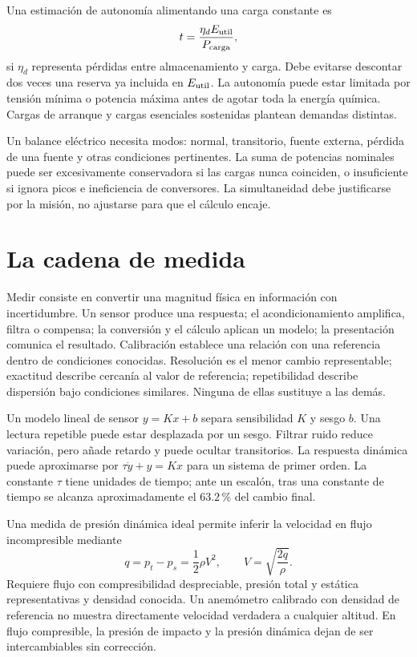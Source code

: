 Una estimación de autonomía alimentando una carga constante es
\begin{equation}
 t=\frac{\eta_d E_{\rm util}}{P_{\rm carga}},
\end{equation}
si $\eta_d$ representa pérdidas entre almacenamiento y carga. Debe evitarse descontar dos veces una reserva ya incluida en $E_{\rm util}$. La autonomía puede estar limitada por tensión mínima o potencia máxima antes de agotar toda la energía química. Cargas de arranque y cargas esenciales sostenidas plantean demandas distintas.

Un balance eléctrico necesita modos: normal, transitorio, fuente externa, pérdida de una fuente y otras condiciones pertinentes. La suma de potencias nominales puede ser excesivamente conservadora si las cargas nunca coinciden, o insuficiente si ignora picos e ineficiencia de conversores. La simultaneidad debe justificarse por la misión, no ajustarse para que el cálculo encaje.

\section{La cadena de medida}
Medir consiste en convertir una magnitud física en información con incertidumbre. Un sensor produce una respuesta; el acondicionamiento amplifica, filtra o compensa; la conversión y el cálculo aplican un modelo; la presentación comunica el resultado. Calibración establece una relación con una referencia dentro de condiciones conocidas. Resolución es el menor cambio representable; exactitud describe cercanía al valor de referencia; repetibilidad describe dispersión bajo condiciones similares. Ninguna de ellas sustituye a las demás.

Un modelo lineal de sensor $y=Kx+b$ separa sensibilidad $K$ y sesgo $b$. Una lectura repetible puede estar desplazada por un sesgo. Filtrar ruido reduce variación, pero añade retardo y puede ocultar transitorios. La respuesta dinámica puede aproximarse por $\tau\dot y+y=Kx$ para un sistema de primer orden. La constante $\tau$ tiene unidades de tiempo; ante un escalón, tras una constante de tiempo se alcanza aproximadamente el $63.2\,\text{\%}$ del cambio final.

Una medida de presión dinámica ideal permite inferir la velocidad en flujo incompresible mediante
\begin{equation}
 q=p_t-p_s=\frac12\rho V^2,\qquad V=\sqrt{\frac{2q}{\rho}}.
\end{equation}
Requiere flujo con compresibilidad despreciable, presión total y estática representativas y densidad conocida. Un anemómetro calibrado con densidad de referencia no muestra directamente velocidad verdadera a cualquier altitud. En flujo compresible, la presión de impacto y la presión dinámica dejan de ser intercambiables sin corrección.

